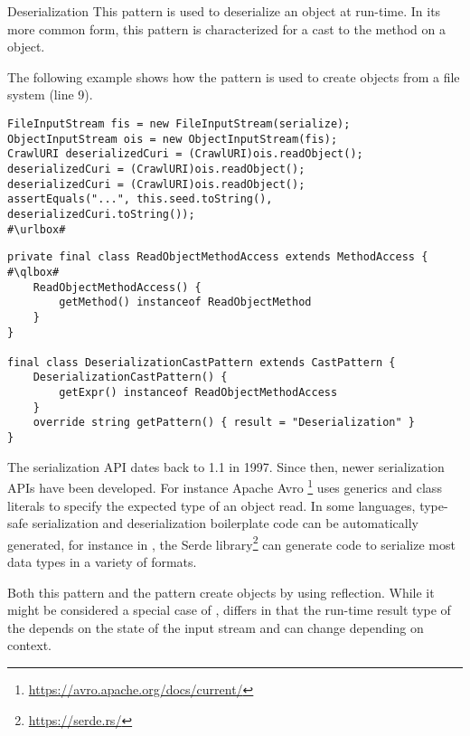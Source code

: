 \begin{pattern}{Deserialization}
This pattern is used to deserialize an object at run-time.
In its more common form,
this pattern is characterized for a cast to the  method on a  object.

\instances{}
The following example shows how the \thisp{} pattern is used to create objects from a file system (line 9).

\def\urlvar{http://bit.ly/internetarchive_heritrix3_2SF4j7k}
\begin{verbatim}
FileInputStream fis = new FileInputStream(serialize);
ObjectInputStream ois = new ObjectInputStream(fis);
CrawlURI deserializedCuri = (CrawlURI)ois.readObject();
deserializedCuri = (CrawlURI)ois.readObject();
deserializedCuri = (CrawlURI)ois.readObject();
assertEquals("...", this.seed.toString(), deserializedCuri.toString());
#\urlbox#
\end{verbatim}


\detection{}

\begin{listing}
\begin{verbatim}
private final class ReadObjectMethodAccess extends MethodAccess { #\qlbox#
    ReadObjectMethodAccess() {
        getMethod() instanceof ReadObjectMethod
    }
}

final class DeserializationCastPattern extends CastPattern {
    DeserializationCastPattern() {
        getExpr() instanceof ReadObjectMethodAccess
    }
    override string getPattern() { result = "Deserialization" }
}
\end{verbatim}
\end{listing}


\issues{}
The serialization API dates back to \java{} 1.1 in 1997.
Since then, newer serialization APIs have been developed.
For instance Apache Avro%
\footnote{\url{https://avro.apache.org/docs/current/}}
uses generics and class literals to specify the expected type of an object read. 
In some languages,
type-safe serialization and deserialization boilerplate code can be automatically generated,
for instance in \rust{},
the Serde library\footnote{\url{https://serde.rs/}}
can generate code to serialize most data types
in a variety of formats.

Both this pattern and the  pattern create objects by using reflection.
While it might be considered a special case of , 
\thisp{} differs in that the run-time result type of the  depends on the state of the input stream and can change depending on context.
 
\end{pattern}